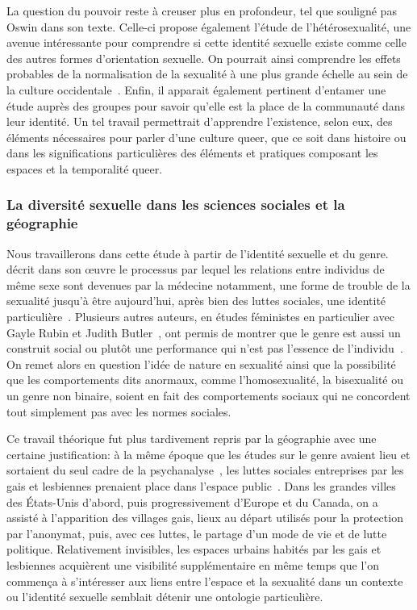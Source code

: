 La question du pouvoir reste à creuser plus en profondeur, tel que souligné pas Oswin dans son texte. 
Celle-ci propose également l'étude de l'hétérosexualité, une avenue intéressante pour comprendre si cette identité sexuelle existe comme celle des autres formes d'orientation sexuelle. 
On pourrait ainsi comprendre les effets probables de la normalisation de la sexualité à une plus grande échelle au sein de la culture occidentale~\citep[100]{Oswin2008}. 
Enfin, il apparait également pertinent d’entamer une étude auprès des groupes \lgbt{} pour savoir qu'elle est la place de la communauté dans leur identité. 
Un tel travail permettrait d'apprendre l'existence, selon eux, des éléments nécessaires pour parler d'une culture queer, que ce soit dans histoire ou dans les significations particulières des éléments et pratiques composant les espaces et la temporalité queer.

\subsubsection{La diversité sexuelle dans les sciences sociales et la géographie}
\label{ssub:la_diversit_sexuelle_dans_les_sciences_sociales_et_la_g_ographie}
Nous travaillerons dans cette étude à partir de l'identité sexuelle et du genre.
\citet{Foucault2011} décrit dans son œuvre  le processus par lequel les relations entre individus de même sexe sont devenues par la médecine notamment, une forme de trouble de la sexualité jusqu'à être aujourd'hui, après bien des luttes sociales, une identité particulière~\citep{Foucault2011}. 
Plusieurs autres auteurs, en études féministes en particulier avec Gayle Rubin et Judith Butler~\citep[98]{Marcus2005}, ont permis de montrer que le genre est aussi un construit social ou plutôt une performance qui n'est pas l'essence de l'individu~\citep{Butler2007}. 
On remet alors en question l'idée de nature en sexualité ainsi que la possibilité que les comportements dits anormaux, comme l'homosexualité, la bisexualité ou un genre non binaire, soient en fait des comportements sociaux qui ne concordent tout simplement pas avec les normes sociales.

Ce travail théorique fut plus tardivement repris par la géographie avec une certaine justification: à la même époque que les études sur le genre avaient lieu et sortaient du seul cadre de la psychanalyse~\citep{Rubin2011a,Rubin2011}, les luttes sociales entreprises par les gais et lesbiennes prenaient place dans l'espace public~\citep[422-427]{Spencer2005}. 
Dans les grandes villes des États-Unis d'abord, puis progressivement d'Europe et du Canada, on a assisté à l'apparition des villages gais, lieux au départ utilisés pour la protection par l'anonymat, puis, avec ces luttes, le partage d'un mode de vie et de lutte politique. 
Relativement invisibles, les espaces urbains habités par les gais et lesbiennes acquièrent une visibilité supplémentaire en même temps que l'on commença à s'intéresser aux liens entre l'espace et la sexualité dans un contexte ou l'identité sexuelle semblait détenir une ontologie particulière.

